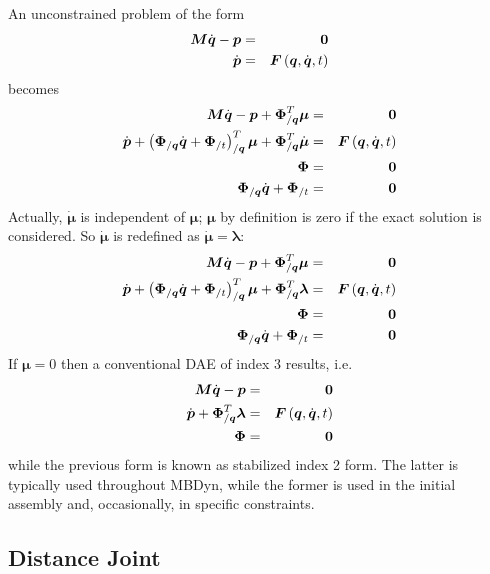 \documentclass[10pt,dvips,fleqn]{report}
\newcommand{\T}[1]{\boldsymbol{#1}}
\begin{document}
An unconstrained problem of the form
\begin{eqnarray*}
	\T{M} \dot{\T{q}} - \T{p} & = & \T{0} \\
	\dot{\T{p}} & = & \T{F}\plbr{\T{q}, \dot{\T{q}}, t}
\end{eqnarray*}
becomes
\begin{eqnarray*}
	\T{M} \dot{\T{q}} - \T{p} + \T{\Phi}_{/\T{q}}^T \T{\mu} & = & \T{0} \\
	\dot{\T{p}} + \plbr{
		\T{\Phi}_{/\T{q}} \dot{\T{q}}
		+ \T{\Phi}_{/t}
	}_{/\T{q}}^T \T{\mu}
	+ \T{\Phi}_{/\T{q}}^T \dot{\T{\mu}} & = & \T{F}\plbr{\T{q}, \dot{\T{q}}, t} \\
	\T{\Phi} & = & \T{0} \\
	\T{\Phi}_{/\T{q}} \dot{\T{q}} + \T{\Phi}_{/t} & = & \T{0}
\end{eqnarray*}
Actually, $\dot{\T{\mu}}$ is independent of $\T{\mu}$;
$\T{\mu}$ by definition is zero if the exact solution is considered.
So $\dot{\T{\mu}}$ is redefined as $\dot{\T{\mu}}=\T{\lambda}$:
\begin{eqnarray*}
	\T{M} \dot{\T{q}} - \T{p} + \T{\Phi}_{/\T{q}}^T \T{\mu} & = & \T{0} \\
	\dot{\T{p}} + \plbr{
		\T{\Phi}_{/\T{q}} \dot{\T{q}}
		+ \T{\Phi}_{/t}
	}_{/\T{q}}^T \T{\mu} + \T{\Phi}_{/\T{q}}^T \T{\lambda}
		& = & \T{F}\plbr{\T{q}, \dot{\T{q}}, t} \\
	\T{\Phi} & = & \T{0} \\
	\T{\Phi}_{/\T{q}} \dot{\T{q}} + \T{\Phi}_{/t} & = & \T{0}
\end{eqnarray*}
If $\T{\mu}=0$ then a conventional DAE of index 3 results, i.e.
\begin{eqnarray*}
	\T{M} \dot{\T{q}} - \T{p} & = & \T{0} \\
	\dot{\T{p}} + \T{\Phi}_{/\T{q}}^T \T{\lambda}
		& = & \T{F}\plbr{\T{q}, \dot{\T{q}}, t} \\
	\T{\Phi} & = & \T{0}
\end{eqnarray*}
while the previous form is known as stabilized index 2 form.
The latter is typically used throughout MBDyn, while the former is used 
in the initial assembly and, occasionally, in specific constraints.

\subsection{Distance Joint}
\end{document}
